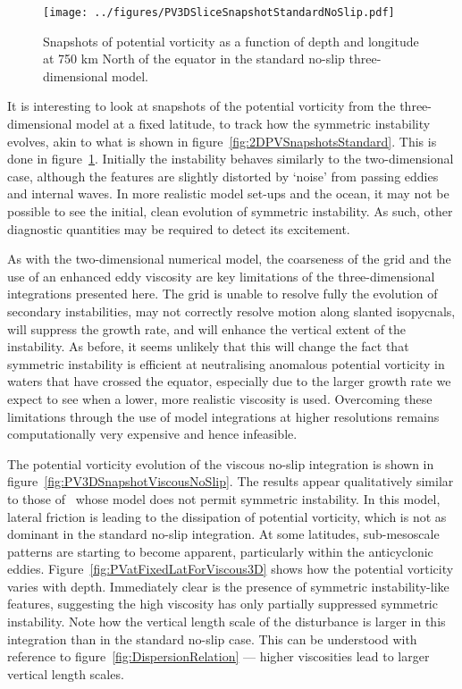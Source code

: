 \begin{figure} 
    \centering
    \texttt{[image: ../figures/PV3DSliceSnapshotStandardNoSlip.pdf]}
    \caption{Snapshots of potential vorticity as a function of depth and longitude at 750 km  North of the equator in the standard no-slip three-dimensional model.}
    \label{fig:PVatFixedLatStandardNoSlip3D}
\end{figure}

It is interesting to look at snapshots of the potential vorticity from the three-dimensional model at a fixed latitude, to track how the symmetric instability evolves, akin to what is shown in figure~\ref{fig:2DPVSnapshotsStandard}.
This is done in figure~\ref{fig:PVatFixedLatStandardNoSlip3D}. Initially the instability behaves similarly to the two-dimensional case, although the features are slightly distorted by `noise' from passing eddies and internal waves. In more realistic model set-ups and the ocean, it may not be possible to see the initial, clean evolution of symmetric instability. As such, other diagnostic quantities may be required to detect its excitement.

As with the two-dimensional numerical model, the coarseness of the grid and the use of an enhanced eddy viscosity are key limitations of the three-dimensional integrations presented here. The grid is unable to resolve fully the evolution of secondary instabilities, may not correctly resolve motion along slanted isopycnals, will suppress the growth rate, and will enhance the vertical extent of the instability. As before, it seems unlikely that this will change the fact that symmetric instability is efficient at neutralising anomalous potential vorticity in waters that have crossed the equator, especially due to the larger growth rate we expect to see when a lower, more realistic viscosity is used. Overcoming these limitations through the use of model integrations at higher resolutions remains computationally very expensive and hence infeasible. 

The potential vorticity evolution of the viscous no-slip integration is shown in figure~\ref{fig:PV3DSnapshotViscousNoSlip}. The results appear qualitatively similar to those of~\citet{Edwards1998I} whose model does not permit symmetric instability. In this model, lateral friction is leading to the dissipation of potential vorticity, which is not as dominant in the standard no-slip integration. At some latitudes, sub-mesoscale patterns are starting to become apparent, particularly within the anticyclonic eddies. Figure~\ref{fig:PVatFixedLatForViscous3D} shows how the potential vorticity varies with depth. Immediately clear is the presence of symmetric instability-like features, suggesting the high viscosity has only partially suppressed symmetric instability. Note how the vertical length scale of the disturbance is larger in this integration than in the standard no-slip case. This can be understood with reference to figure~\ref{fig:DispersionRelation} --- higher viscosities lead to larger vertical length scales.

